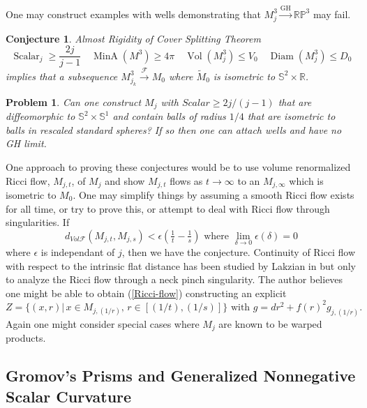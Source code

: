 \documentclass[12pt]{amsart}
\newtheorem{conj}[thm]{Conjecture}
\newtheorem{problem}[thm]{Problem}
\begin{document}
One may construct examples with wells demonstrating
that $M_{j}^3 {\stackrel { \textrm{GH}}{\longrightarrow} } \mathbb{RP}^3$ may fail.

\begin{conj} Almost Rigidity of Cover Splitting Theorem
\begin{equation} 
{\operatorname{Scalar}}_j \ge \frac{2j}{j-1} \quad {\operatorname{MinA}}(M^3)\ge 4\pi \quad
{\operatorname{Vol}}(M_j^3)\le V_0 \quad {\operatorname{Diam}}(M_j^3)\le D_0
\end{equation}
implies that a subsequence $M_{j_k}^3 {\stackrel {\mathcal{F}}{\longrightarrow} } M_0$
where 
$\tilde{M}_0$ is isometric to $\mathbb{S}^2\times \mathbb{R}$.
\end{conj}

\begin{problem}\label{well-cylinder}
Can one construct $M_j$ with $Scalar \ge 2j/(j-1)$ that are diffeomorphic
to ${\mathbb{S}}^2 \times {\mathbb{S}}^1$
and contain balls of radius $1/4$ that are isometric to 
balls in rescaled standard spheres?  If so then one can attach wells
and have no GH limit.
\end{problem}

One approach to proving these conjectures would be to use 
volume renormalized Ricci flow, $M_{j,t}$, of $M_j$ and show 
$M_{j,t}$ flows as $t\to \infty$ to an $M_{j,\infty}$ which is
isometric to $M_0$.  One may simplify things by assuming
a smooth Ricci flow exists for all time, or try to prove this,
or attempt to deal with Ricci flow through singularities.  If
\begin{equation}\label{Ricci-flow}
d_{Vol\mathcal{F}}(M_{j,t}, M_{j,s}) < \epsilon\left(\tfrac{1}{t}-\tfrac{1}{s}\right)
\textrm{ where } \lim_{\delta\to 0} \epsilon(\delta) =0
\end{equation}   
where $\epsilon$ is independant of $j$, then we have the conjecture.
Continuity of Ricci flow with respect to the intrinsic flat distance has
been studied by Lakzian in \cite{Lakzian-Ricci-flow} but only to analyze the
Ricci flow through a neck pinch singularity.  The author believes one might
be able to obtain (\ref{Ricci-flow}) constructing an explicit 
\begin{equation}
Z=\{(x,r)|\, x\in M_{j,(1/r)},\, r\in [(1/t), (1/s)]\} 
\textrm{ with } g=dr^2 + f(r)^2 g_{j,(1/r)}.
\end{equation} 
Again one might consider special cases where $M_j$ are known to be warped products.

\subsection{Gromov's Prisms and Generalized Nonnegative Scalar Curvature} \label{sect-generalized}
\end{document}
